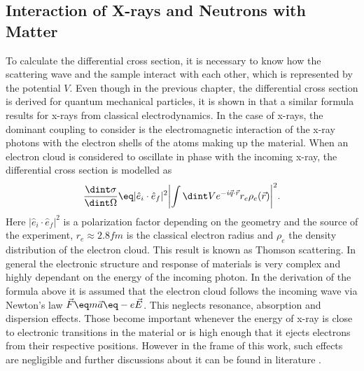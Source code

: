 \documentclass[\main/dresen_thesis.tex]{subfiles}
\begin{document}
  \subsection{Interaction of X-rays and Neutrons with Matter}\label{sec:theoreticalBackground:scattering:interactionWithMatter}
    To calculate the differential cross section, it is necessary to know how the scattering wave and the sample interact with each other, which is represented by the potential $V$.
    Even though in the previous chapter, the differential cross section is derived for quantum mechanical particles, it is shown in  that a similar formula results for x-rays from classical electrodynamics.
    In the case of x-rays, the dominant coupling to consider is the electromagnetic interaction of the x-ray photons with the electron shells of the atoms making up the material.
    When an electron cloud is considered to oscillate in phase with the incoming x-ray, the differential cross section is modelled as
    \begin{align}
      \frac{\dint \sigma}{\dint \Omega} \eq |\hat{e}_i \cdot \hat{e}_f|^2 \biggl| \int \dint V e^{-i \vec{q} \cdot \vec{r}}  r_e \rho_e (\vec{r}) \biggr|^2.
    \end{align}
    Here $|\hat{e}_i \cdot \hat{e}_f|^2$ is a polarization factor depending on the geometry and the source of the experiment, $r_e \approx 2.8 \unit{fm}$ is the classical electron radius and $\rho_e$ the density distribution of the electron cloud.
    This result is known as Thomson scattering.
    In general the electronic structure and response of materials is very complex and highly dependant on the energy of the incoming photon.
    In the derivation of the formula above it is assumed that the electron cloud follows the incoming wave via Newton's law $\vec{F} \eq m \vec{a} \eq -e\vec{E}$.
    This neglects resonance, absorption and dispersion effects.
    Those become important whenever the energy of x-ray is close to electronic transitions in the material or is high enough that it  ejects electrons from their respective positions.
    However in the frame of this work, such effects are negligible and further discussions about it can be found in literature \cite{AlsNielsen_2011_Eleme}.
\end{document}
